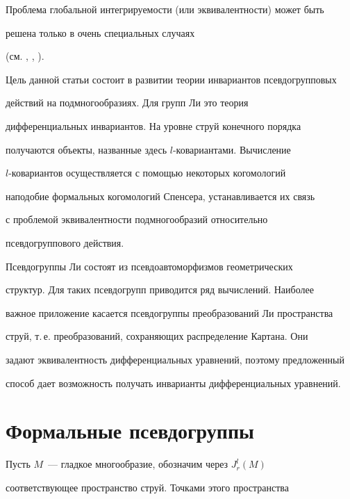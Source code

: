 Проблема глобальной интегрируемости (или эквивалентности) может быть


решена только в очень специальных случаях


(см. \cite{S}, \cite{GS}, \cite{T}).








Цель данной статьи состоит в развитии теории инвариантов псевдогрупповых


действий на подмногообразиях. Для групп Ли это теория 


дифференциальных инвариантов. На уровне струй конечного порядка


получаются объекты, названные здесь $l$-ковариантами. Вычисление


$l$-ковариантов осуществляется с помощью некоторых когомологий


наподобие формальных когомологий Спенсера, устанавливается их связь


с проблемой эквивалентности подмногообразий относительно


псевдогруппового действия.


Псевдогруппы Ли состоят из псевдоавтоморфизмов геометрических


структур. Для таких псевдогрупп приводится ряд вычислений. Наиболее


важное приложение касается псевдогруппы преобразований Ли пространства


струй, т.\,е. преобразований, сохраняющих распределение Картана. Они


задают эквивалентность дифференциальных уравнений, поэтому предложенный


способ дает возможность получать инварианты дифференциальных уравнений.











\section{Формальные псевдогруппы}\label{sec1}





Пусть $M$~--- гладкое многообразие, обозначим через $J^l_r(M)$


соответствующее пространство струй. Точками этого пространства


